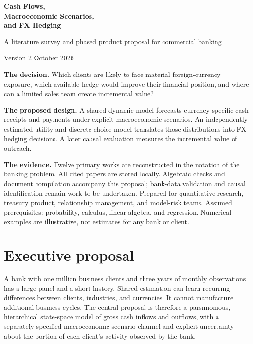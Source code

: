 \documentclass[11pt,a4paper,oneside]{report}
\numberwithin{equation}{chapter}
\begin{document}
\hypersetup{pageanchor=false}
\begin{titlepage}
\vspace*{18mm}
{\Huge\bfseries Cash Flows,\\ Macroeconomic Scenarios,\\ and FX Hedging\par}
\vspace{8mm}
{\Large A literature survey and phased product proposal for commercial banking\par}
\vspace{10mm}
{\large Version 2  October 2026\par}
\vspace{15mm}
\textbf{The decision.} Which clients are likely to face material foreign-currency exposure, which available hedge would improve their financial position, and where can a limited sales team create incremental value?

\textbf{The proposed design.} A shared dynamic model forecasts currency-specific cash receipts and payments under explicit macroeconomic scenarios. An independently estimated utility and discrete-choice model translates those distributions into FX-hedging decisions. A later causal evaluation measures the incremental value of outreach.

\textbf{The evidence.} Twelve primary works are reconstructed in the notation of the banking problem. All cited papers are stored locally. Algebraic checks and document compilation accompany this proposal; bank-data validation and causal identification remain work to be undertaken.
\vfill
Prepared for quantitative research, treasury product, relationship management, and model-risk teams. Assumed prerequisites: probability, calculus, linear algebra, and regression. Numerical examples are illustrative, not estimates for any bank or client.
\end{titlepage}
\hypersetup{pageanchor=true}
\chapter*{Executive proposal}
A bank with one million business clients and three years of monthly observations has a large panel and a short history. Shared estimation can learn recurring differences between clients, industries, and currencies. It cannot manufacture additional business cycles. The central proposal is therefore a parsimonious, hierarchical state-space model of gross cash inflows and outflows, with a separately specified macroeconomic scenario channel and explicit uncertainty about the portion of each client's activity observed by the bank.
\end{document}
